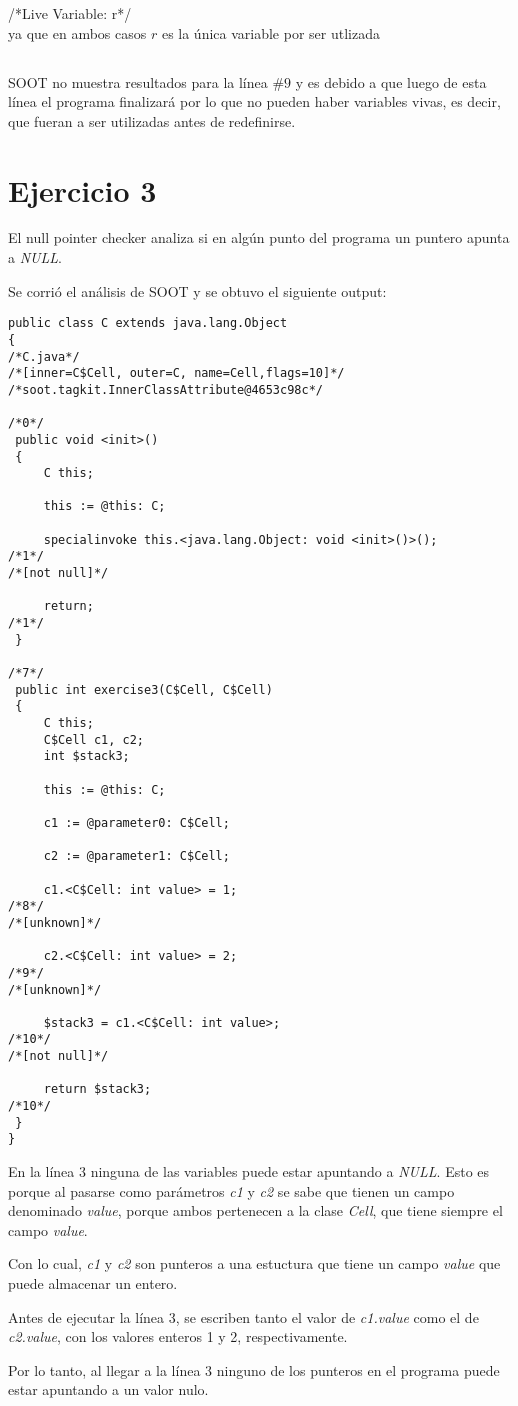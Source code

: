 /*Live Variable: r*/
\\

ya que en ambos casos $r$ es la única variable por ser utlizada

\subsection{}
SOOT no muestra resultados para la línea $\#9$ y es debido a que luego de esta
línea el programa finalizará por lo que no pueden haber variables vivas, es
decir, que fueran a ser utilizadas antes de redefinirse.

\section*{Ejercicio 3}
El null pointer checker analiza si en algún punto del programa un puntero apunta a \textit{NULL}.

Se corrió el análisis de SOOT y se obtuvo el siguiente output:

\begin{verbatim}
public class C extends java.lang.Object
{
/*C.java*/
/*[inner=C$Cell, outer=C, name=Cell,flags=10]*/
/*soot.tagkit.InnerClassAttribute@4653c98c*/

/*0*/
 public void <init>()
 {
     C this;

     this := @this: C;

     specialinvoke this.<java.lang.Object: void <init>()>();
/*1*/
/*[not null]*/

     return;
/*1*/
 }

/*7*/
 public int exercise3(C$Cell, C$Cell)
 {
     C this;
     C$Cell c1, c2;
     int $stack3;

     this := @this: C;

     c1 := @parameter0: C$Cell;

     c2 := @parameter1: C$Cell;

     c1.<C$Cell: int value> = 1;
/*8*/
/*[unknown]*/

     c2.<C$Cell: int value> = 2;
/*9*/
/*[unknown]*/

     $stack3 = c1.<C$Cell: int value>;
/*10*/
/*[not null]*/

     return $stack3;
/*10*/
 }
}
\end{verbatim}

En la línea 3 ninguna de las variables puede estar apuntando a \textit{NULL}. Esto es porque al pasarse como parámetros \textit{c1} y \textit{c2} se sabe que tienen un campo denominado \textit{value}, porque ambos pertenecen a la clase \textit{Cell}, que tiene siempre el campo \textit{value}.

Con lo cual, \textit{c1} y \textit{c2} son punteros a una estuctura que tiene un campo \textit{value} que puede almacenar un entero.

Antes de ejecutar la línea 3, se escriben tanto el valor de \textit{c1.value} como el de \textit{c2.value}, con los valores enteros 1 y 2, respectivamente.

Por lo tanto, al llegar a la línea 3 ninguno de los punteros en el programa puede estar apuntando a un valor nulo.